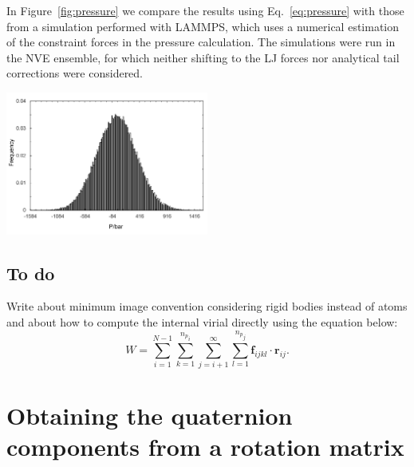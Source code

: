 \documentclass[aip,jcp,reprint,amsmath,amssymb]{revtex4-1}
\newcommand{\vt}[1]{\boldsymbol{\mathbf{#1}}}           %
\begin{document}
In Figure~\ref{fig:pressure} we compare the results using Eq.~\ref{eq:pressure} with those from a simulation performed with LAMMPS, which uses a numerical estimation of the constraint forces in the pressure calculation. The simulations were run in the NVE ensemble, for which neither shifting to the LJ forces nor analytical tail corrections were considered. 


\begin{center}
\label{fig:pressure}
\includegraphics[width=0.5\textwidth,keepaspectratio]{FiguraAna}
\end{center}

\subsection{To do}

Write about minimum image convention considering rigid bodies instead of atoms and about how to compute the internal virial directly using the equation below:
\[
W = \sum_{i=1}^{N-1} \sum_{k=1}^{{n_p}_i} \sum_{j=i+1}^{\infty} \sum_{l=1}^{{n_p}_j} {\vt f}_{ijkl} \cdot {\vt r}_{ij}.
\]

\appendix

\section{\label{sec:quat_from_A}Obtaining the quaternion components from a rotation matrix}
\end{document}
